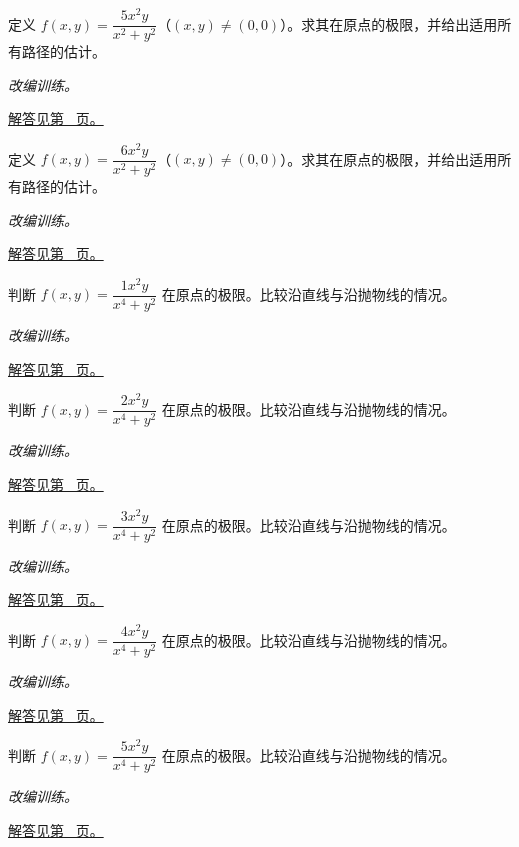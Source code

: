 \documentclass[UTF8,12pt,a4paper,fontset=fandol]{ctexart}
\begin{document}
\begin{example}[极坐标估计证明极限]\label{ex:c32q6}
定义 $f(x,y)=\dfrac{5x^2y}{x^2+y^2}$（$(x,y)\ne(0,0)$）。求其在原点的极限，并给出适用所有路径的估计。
\par\textit{改编训练。}\par\hyperref[ans:c32q6]{解答见第~\pageref{ans:c32q6} 页。}
\end{example}
\begin{example}[极坐标估计证明极限]\label{ex:c32q7}
定义 $f(x,y)=\dfrac{6x^2y}{x^2+y^2}$（$(x,y)\ne(0,0)$）。求其在原点的极限，并给出适用所有路径的估计。
\par\textit{改编训练。}\par\hyperref[ans:c32q7]{解答见第~\pageref{ans:c32q7} 页。}
\end{example}
\begin{example}[直线路径一致仍可能无极限]\label{ex:c32q8}
判断 $f(x,y)=\dfrac{1x^2y}{x^4+y^2}$ 在原点的极限。比较沿直线与沿抛物线的情况。
\par\textit{改编训练。}\par\hyperref[ans:c32q8]{解答见第~\pageref{ans:c32q8} 页。}
\end{example}
\begin{example}[直线路径一致仍可能无极限]\label{ex:c32q9}
判断 $f(x,y)=\dfrac{2x^2y}{x^4+y^2}$ 在原点的极限。比较沿直线与沿抛物线的情况。
\par\textit{改编训练。}\par\hyperref[ans:c32q9]{解答见第~\pageref{ans:c32q9} 页。}
\end{example}
\begin{example}[直线路径一致仍可能无极限]\label{ex:c32q10}
判断 $f(x,y)=\dfrac{3x^2y}{x^4+y^2}$ 在原点的极限。比较沿直线与沿抛物线的情况。
\par\textit{改编训练。}\par\hyperref[ans:c32q10]{解答见第~\pageref{ans:c32q10} 页。}
\end{example}
\begin{example}[直线路径一致仍可能无极限]\label{ex:c32q11}
判断 $f(x,y)=\dfrac{4x^2y}{x^4+y^2}$ 在原点的极限。比较沿直线与沿抛物线的情况。
\par\textit{改编训练。}\par\hyperref[ans:c32q11]{解答见第~\pageref{ans:c32q11} 页。}
\end{example}
\begin{example}[直线路径一致仍可能无极限]\label{ex:c32q12}
判断 $f(x,y)=\dfrac{5x^2y}{x^4+y^2}$ 在原点的极限。比较沿直线与沿抛物线的情况。
\par\textit{改编训练。}\par\hyperref[ans:c32q12]{解答见第~\pageref{ans:c32q12} 页。}
\end{example}
\end{document}
